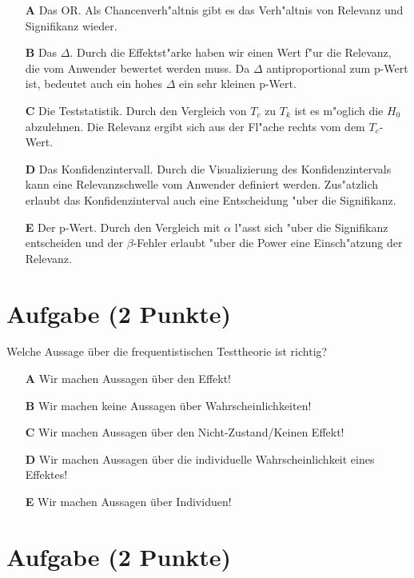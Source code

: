 \documentclass[a4paper, 10pt]{scrartcl}\usepackage[]{graphicx}\usepackage[]{color}
\begin{document}
\begin{enumerate}
\item [\textbf{A} \msquare] Das OR. Als Chancenverh{"a}ltnis gibt es das Verh{"a}ltnis von Relevanz und Signifikanz wieder.
\item [\textbf{B} \msquare] Das $\Delta$. Durch die Effektst{"a}rke haben wir einen Wert f{"u}r die Relevanz, die vom Anwender bewertet werden muss. Da $\Delta$ antiproportional zum p-Wert ist, bedeutet auch ein hohes $\Delta$ ein sehr kleinen p-Wert.
\item [\textbf{C} \msquare] Die Teststatistik. Durch den Vergleich von $T_c$ zu $T_k$ ist es m{"o}glich die $H_0$ abzulehnen. Die Relevanz ergibt sich aus der Fl{"a}che rechts vom dem $T_c$-Wert.
\item [\textbf{D} \msquare] Das Konfidenzintervall. Durch die Visualizierung des Konfidenzintervals kann eine Relevanzschwelle vom Anwender definiert werden. Zus{"a}tzlich erlaubt das Konfidenzinterval auch eine Entscheidung {"u}ber die Signifikanz.
\item [\textbf{E} \msquare] Der p-Wert. Durch den Vergleich mit $\alpha$ l{"a}sst sich {"u}ber die Signifikanz entscheiden und der $\beta$-Fehler erlaubt {"u}ber die Power eine Einsch{"a}tzung der Relevanz.
\end{enumerate}

\section{Aufgabe \hfill (2 Punkte)}



Welche Aussage über die frequentistischen Testtheorie ist richtig?



\begin{enumerate}
\item [\textbf{A} \msquare] Wir machen Aussagen über den Effekt!
\item [\textbf{B} \msquare] Wir machen keine Aussagen über Wahrscheinlichkeiten!
\item [\textbf{C} \msquare] Wir machen Aussagen über den Nicht-Zustand/Keinen Effekt!
\item [\textbf{D} \msquare] Wir machen Aussagen über die individuelle Wahrscheinlichkeit eines Effektes!
\item [\textbf{E} \msquare] Wir machen Aussagen über Individuen!
\end{enumerate}

\section{Aufgabe \hfill (2 Punkte)}
\end{document}
